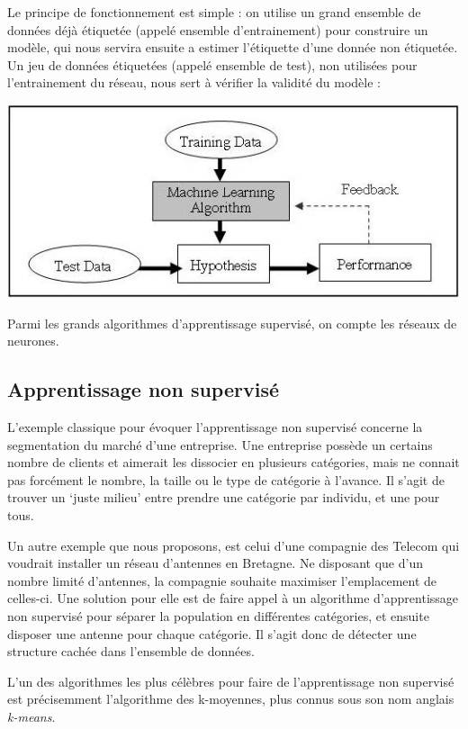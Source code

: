 \documentclass[letterpaper,10pt,english]{sphinxmanual}
\begin{document}
Le principe de fonctionnement est simple : on utilise un grand ensemble de données déjà étiquetée (appelé ensemble d'entrainement) pour construire un modèle, qui nous servira ensuite a estimer l'étiquette d'une donnée non étiquetée. Un jeu de données étiquetées (appelé ensemble de test), non utilisées pour l'entrainement du réseau, nous sert à vérifier la validité du modèle :

{\hfill\includegraphics{AA_diagramm.jpg}\hfill}

Parmi les grands algorithmes d'apprentissage supervisé, on compte les réseaux de neurones.


\subsection{Apprentissage non supervisé}
\label{introduction:apprentissage-non-supervise}
L'exemple classique pour évoquer l'apprentissage non supervisé concerne la segmentation du marché d'une entreprise. Une entreprise possède un certains nombre de clients et aimerait les dissocier en plusieurs catégories, mais ne connait pas forcément le nombre, la taille ou le type de catégorie à l'avance. Il s'agit de trouver un `juste milieu' entre prendre une catégorie par individu, et une pour tous.

Un autre exemple que nous proposons, est celui d'une compagnie des Telecom qui voudrait installer un réseau d'antennes en Bretagne. Ne disposant que d'un nombre limité d'antennes, la compagnie souhaite maximiser l'emplacement de celles-ci. Une solution pour elle est de faire appel à un algorithme d'apprentissage non supervisé pour séparer la population en différentes catégories, et ensuite disposer une antenne pour chaque catégorie.
Il s'agit donc de détecter une structure cachée dans l'ensemble de données.

L'un des algorithmes les plus célèbres pour faire de l'apprentissage non supervisé est précisemment l'algorithme des k-moyennes, plus connus sous son nom anglais \emph{k-means}.
\end{document}
